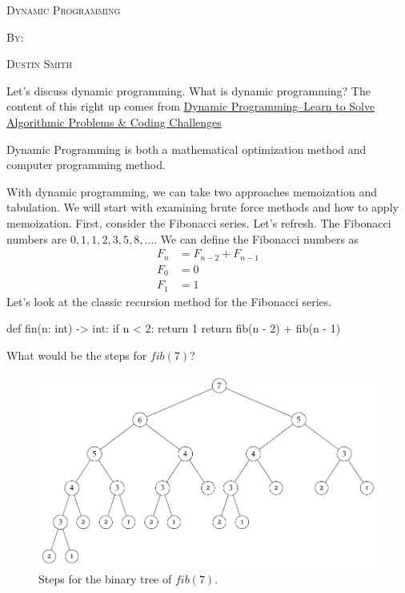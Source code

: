 \documentclass[12pt,dvipsnames,svgnames,x11names]{article}
\begin{document}
%
\pagecolor{gray!50}
\begin{center}
  \begin{center}
  \vspace*{\fill}
  \textsc{\LARGE Dynamic Programming}
  \par\bigskip
  \textsc{By:}
  \par\bigskip
  \textsc{\LARGE Dustin Smith}
  \vspace*{\fill}
\end{center}
\end{center}

\newpage
Let's discuss dynamic programming. What is dynamic programming? The content of this right up
comes from \href{https://www.youtube.com/watch?v=oBt53YbR9Kk}{Dynamic Programming--Learn to Solve Algorithmic Problems \& Coding Challenges}
\begin{definition}
	Dynamic Programming is both a mathematical optimization method and computer programming 
	method.
\end{definition}
\noindent
With dynamic programming, we can take two approaches memoization and tabulation. We will start with
examining brute force methods and how to apply memoization. First, consider the Fibonacci series.
Let's refresh. The Fibonacci numbers are \(0, 1, 1, 2, 3, 5, 8, \ldots\).  We can define the Fibonacci 
numbers as 
\begin{align*}
	F_n & = F_{n - 2} + F_{n - 1}\\
	F_0 & = 0\\
	F_1 & = 1
\end{align*}
Let's look at the classic recursion method for the Fibonacci series.
\begin{python}
def fin(n: int) -> int:
  if n < 2:
    return 1
  return fib(n - 2) + fib(n - 1)
\end{python}
What would be the steps for \(fib(7)\)?
\begin{figure}[h]
	\centering
	\includegraphics[width=6in]{dp_fib.pdf}
	\caption{Steps for the binary tree of \(fib(7)\).}
	\label{fig:fib_binary_tree}
\end{figure}
\end{document}
